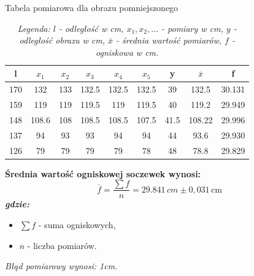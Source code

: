 \documentclass[12pt]{article}
\begin{document}
\begin{table}[H]
    \centering
    \caption{Tabela pomiarowa dla obrazu pomniejszonego}
    \begin{tabular}{|c|c|c|c|c|c|c|c|c|}
        \hline
        \textbf{l} & \textbf{$x_1$} & \textbf{$x_2$} & \textbf{$x_3$} & \textbf{$x_4$} & \textbf{$x_5$} & \textbf{y} & \textbf{$\bar{x}$} & \textbf{f} \\ \hline
        170           & 132       & 133        & 132.5       & 132.5        & 132.5       & 39        & 132.5       & 30.131        \\ \hline
        159           & 119       & 119        & 119.5       & 119        & 119.5       & 40        & 119.2       & 29.949        \\ \hline
        148           & 108.6     & 108        & 108.5       & 108.5        & 107.5       & 41.5        & 108.22       & 29.996        \\ \hline
        137           & 94       & 93        & 93       & 94        & 94       & 44        & 93.6       & 29.930        \\ \hline
        126           & 79       & 79        & 79       & 79        & 78       & 48        & 78.8       & 29.829        \\ \hline
    \end{tabular}
    \captionsetup{font=small, justification=centering}
    \caption*{\textit{Legenda: $l$ - odległość w cm, $x_1, x_2, \dots$ - pomiary w cm, $y$ - odległość obrazu w cm, $\bar{x}$ - średnia wartość pomiarów, $f$ - ogniskowa w cm.}}
\end{table}

\bfseries{Średnia wartość ogniskowej soczewek wynosi:}
\begin{equation}
    \bar{f} = \frac{\sum f}{n} = 29.841\,cm \pm 0,031 \, \mathrm{cm}
\end{equation}
\textit{gdzie:}
\begin{itemize}
    \item $\sum f$ - suma ogniskowych,
    \item $n$ - liczba pomiarów.
\end{itemize}
\textit{Błąd pomiarowy wynosi: 1cm.}
\end{document}
